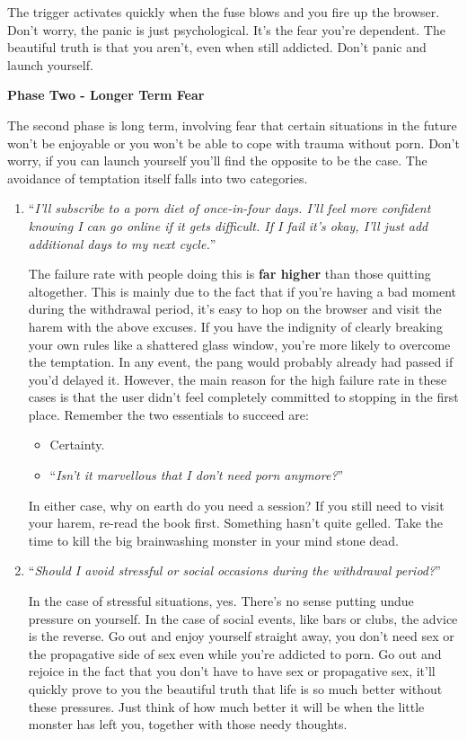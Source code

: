 \documentclass[
]{book}
\begin{document}
The trigger activates quickly when the fuse blows and you fire up the browser. Don't worry, the panic is just psychological. It's the fear you're dependent. The beautiful truth is that you aren't, even when still addicted. Don't panic and launch yourself.

\textbf{Phase Two - Longer Term Fear}

The second phase is long term, involving fear that certain situations in the future won't be enjoyable or you won't be able to cope with trauma without porn. Don't worry, if you can launch yourself you'll find the opposite to be the case. The avoidance of temptation itself falls into two categories.

\begin{enumerate}
\def\labelenumi{\arabic{enumi}.}
\item
  ``\emph{I'll subscribe to a porn diet of once-in-four days. I'll feel more confident knowing I can go online if it gets difficult. If I fail it's okay, I'll just add additional days to my next cycle.}''

  The failure rate with people doing this is \textbf{far higher} than those quitting altogether. This is mainly due to the fact that if you're having a bad moment during the withdrawal period, it's easy to hop on the browser and visit the harem with the above excuses. If you have the indignity of clearly breaking your own rules like a shattered glass window, you're more likely to overcome the temptation. In any event, the pang would probably already had passed if you'd delayed it. However, the main reason for the high failure rate in these cases is that the user didn't feel completely committed to stopping in the first place. Remember the two essentials to succeed are:

  \begin{itemize}
  \item
    Certainty.
  \item
    ``\emph{Isn't it marvellous that I don't need porn anymore?}''
  \end{itemize}

  In either case, why on earth do you need a session? If you still need to visit your harem, re-read the book first. Something hasn't quite gelled. Take the time to kill the big brainwashing monster in your mind stone dead.
\item
  ``\emph{Should I avoid stressful or social occasions during the withdrawal period?}''

  In the case of stressful situations, yes. There's no sense putting undue pressure on yourself. In the case of social events, like bars or clubs, the advice is the reverse. Go out and enjoy yourself straight away, you don't need sex or the propagative side of sex even while you're addicted to porn. Go out and rejoice in the fact that you don't have to have sex or propagative sex, it'll quickly prove to you the beautiful truth that life is so much better without these pressures. Just think of how much better it will be when the little monster has left you, together with those needy thoughts.
\end{enumerate}
\end{document}

